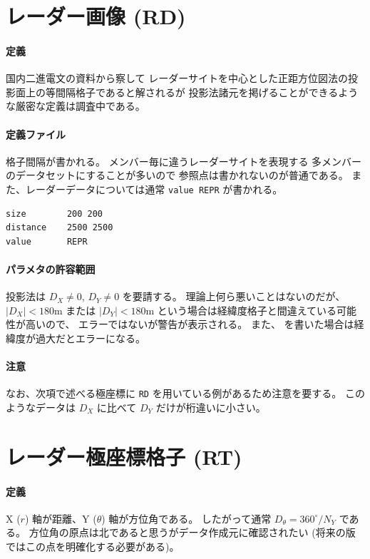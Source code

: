 \section{レーダー画像 (RD)}

\paragraph{定義}
国内二進電文の資料から察して
レーダーサイトを中心とした正距方位図法の投影面上の等間隔格子であると解されるが
投影法諸元を掲げることができるような厳密な定義は調査中である。
\paragraph{定義ファイル}
格子間隔が書かれる。
メンバー毎に違うレーダーサイトを表現する
多メンバーのデータセットにすることが多いので
参照点は書かれないのが普通である。
また、レーダーデータについては通常 \verb|value REPR| が書かれる。
\begin{screen}
\begin{verbatim}
size        200 200
distance    2500 2500
value       REPR
\end{verbatim}
\end{screen}

\paragraph{パラメタの許容範囲}
投影法は
\(D_X \ne 0\),
\(D_Y \ne 0\)
を要請する。
理論上何ら悪いことはないのだが、
\(|D_X| < 180\)m
または
\(|D_Y| < 180\)m
という場合は経緯度格子と間違えている可能性が高いので、
エラーではないが警告が表示される。
また、 を書いた場合は経緯度が過大だとエラーになる。

\paragraph{注意}
なお、次項で述べる極座標に {\tt RD} を用いている例があるため注意を要する。
このようなデータは $D_X$ に比べて $D_Y$ だけが桁違いに小さい。

\section{レーダー極座標格子 (RT)}

\paragraph{定義}
X ($r$) 軸が距離、Y ($\theta$) 軸が方位角である。
したがって通常 $D_\theta = 360^\circ / N_Y$ である。
方位角の原点は北であると思うがデータ作成元に確認されたい
(将来の版ではこの点を明確化する必要がある)。

